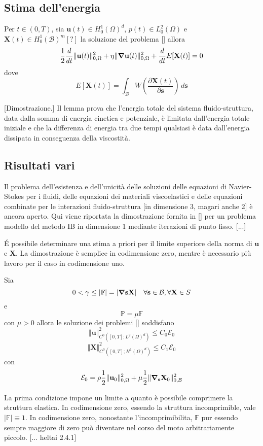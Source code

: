 \subsection{Stima dell'energia}
\begin{lemma}
Per $t \in (0,T)$, sia $\mathbf{u}(t)\in H^1_0(\Omega)^d$, $p(t)\in L^2_0(\Omega)$ e $\mathbf{X}(t)\in H^1_0(\mathcal{B})^m [?]$ la soluzione del problema [] allora $$\frac{1}{2}\frac{d}{dt}\Vert\mathbf{u}(t)\Vert^2_{0,\Omega}+\eta\Vert\boldsymbol{\nabla}\mathbf{u}(t)\Vert^2_{0,\Omega}+\frac{d}{dt}E[\mathbf{X}(t)]=0$$
dove 
$$E[\mathbf{X}(t)]=\int_\mathcal{B}W\left (\frac{\partial \mathbf{X}(t)}{\partial \mathbf{s}}\right )\, d\mathbf{s}$$
\end{lemma}
[Dimostrazione.]
Il lemma prova che l'energia totale del sistema fluido-struttura, data dalla somma di energia cinetica e potenziale, è limitata dall'energia totale iniziale e che la differenza di energia tra due tempi qualsiasi è data dall'energia dissipata in conseguenza della viscostità.

\subsection{Risultati vari}
Il problema dell'esistenza e dell'unicità delle soluzioni delle equazioni di Navier-Stokes per i fluidi, delle equazioni dei materiali viscoelastici e delle equazioni combinate per le interazioni fluido-struttura [in dimensione 3, magari anche 2] è ancora aperto. Qui viene riportata la dimostrazione fornita in  [] per un problema modello del metodo IB in dimensione 1 mediante iterazioni di punto fisso. [...]

\'E possibile determinare una stima a priori per il limite superiore della norma di $\mathbf{u}$ e $\mathbf{X}$. La dimostrazione è semplice in codimensione zero, mentre è necessario più lavoro per il caso in codimensione uno.

\begin{theorem}
Sia 
\begin{equation}
0<\gamma\leq\vert\mathbb{F}\vert=\vert\boldsymbol{\nabla}\mathbf{s}\mathbf{X}\vert\quad\forall\mathbf{s}\in\mathcal{B},\forall\mathbf{X}\in S
\end{equation}
e 
\begin{equation}
\mathbb{P}=\mu\mathbb{F}
\end{equation}
 con $\mu>0$ allora le soluzione dei problemi [] soddisfano
$$\Vert\mathbf{u}\Vert^2_{C^0([0,T];L^2(\Omega)^d)}\leq C_0\mathcal{E}_0$$
$$\Vert\mathbf{X}\Vert^2_{C^0([0,T];H^1(\Omega)^d)}\leq C_1\mathcal{E}_0$$
con
$$\mathcal{E}_0=\rho\frac{1}{2}\Vert\mathbf{u}_0\Vert^2_{0,\Omega}+\mu\frac{1}{2}\Vert\boldsymbol{\nabla}_\mathbf{s}\mathbf{X}_0\Vert^2_{0,\mathcal{B}}$$
\end{theorem}
La prima condizione impone un limite a quanto è possibile comprimere la struttura elastica. In codimensione zero, essendo la struttura incomprimible, vale $|\mathbb{F}|\equiv1$. In codimensione zero, nonostante l'incomprimibilita, $\mathbb{F}$ pur essendo sempre maggiore di zero può diventare nel corso del moto arbitrariamente piccolo.
[... heltai 2.4.1]

